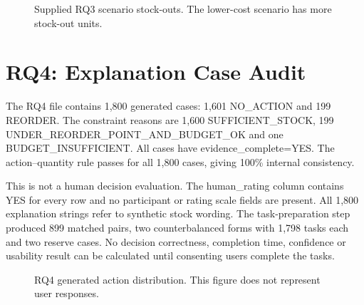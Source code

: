 \begin{figure}[htbp]
\centering
{}
\caption{Supplied RQ3 scenario stock-outs. The lower-cost scenario has more stock-out units.}
\label{fig:rq3_stockout}
\end{figure}

\section{RQ4: Explanation Case Audit}
The RQ4 file contains 1,800 generated cases: 1,601 NO\_ACTION and 199 REORDER. The constraint reasons are 1,600 SUFFICIENT\_STOCK, 199 UNDER\_REORDER\_POINT\_AND\_BUDGET\_OK and one BUDGET\_INSUFFICIENT. All cases have evidence\_complete=YES. The action--quantity rule passes for all 1,800 cases, giving 100\% internal consistency.

This is not a human decision evaluation. The human\_rating column contains YES for every row and no participant or rating scale fields are present. All 1,800 explanation strings refer to synthetic stock wording. The task-preparation step produced 899 matched pairs, two counterbalanced forms with 1,798 tasks each and two reserve cases. No decision correctness, completion time, confidence or usability result can be calculated until consenting users complete the tasks.

\begin{figure}[htbp]
\centering
{}
\caption{RQ4 generated action distribution. This figure does not represent user responses.}
\label{fig:rq4_actions}
\end{figure}

